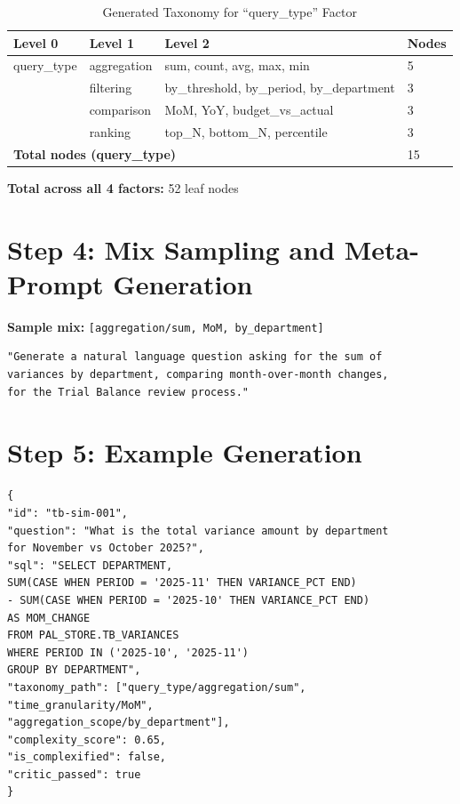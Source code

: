 \documentclass[12pt,a4paper,twoside]{report}
\begin{document}
\begin{table}[H]
\centering
\caption{Generated Taxonomy for ``query\_type'' Factor}
\begin{tabular}{llll}
\toprule
\textbf{Level 0} & \textbf{Level 1} & \textbf{Level 2} & \textbf{Nodes} \\
\midrule
query\_type & aggregation & sum, count, avg, max, min & 5 \\
& filtering & by\_threshold, by\_period, by\_department & 3 \\
& comparison & MoM, YoY, budget\_vs\_actual & 3 \\
& ranking & top\_N, bottom\_N, percentile & 3 \\
\midrule
\multicolumn{3}{l}{\textbf{Total nodes (query\_type)}} & 15 \\
\bottomrule
\end{tabular}
\end{table}

\textbf{Total across all 4 factors:} 52 leaf nodes

\section{Step 4: Mix Sampling and Meta-Prompt Generation}

\textbf{Sample mix:} \texttt{[aggregation/sum, MoM, by\_department]}

\begin{lstlisting}[language=jsonx,caption={Meta-prompt generated}]
"Generate a natural language question asking for the sum of
variances by department, comparing month-over-month changes,
for the Trial Balance review process."
\end{lstlisting}

\section{Step 5: Example Generation}

\begin{lstlisting}[language=jsonx,caption={Generated training example}]
{
"id": "tb-sim-001",
"question": "What is the total variance amount by department
for November vs October 2025?",
"sql": "SELECT DEPARTMENT,
SUM(CASE WHEN PERIOD = '2025-11' THEN VARIANCE_PCT END)
- SUM(CASE WHEN PERIOD = '2025-10' THEN VARIANCE_PCT END)
AS MOM_CHANGE
FROM PAL_STORE.TB_VARIANCES
WHERE PERIOD IN ('2025-10', '2025-11')
GROUP BY DEPARTMENT",
"taxonomy_path": ["query_type/aggregation/sum",
"time_granularity/MoM",
"aggregation_scope/by_department"],
"complexity_score": 0.65,
"is_complexified": false,
"critic_passed": true
}
\end{lstlisting}
\end{document}
